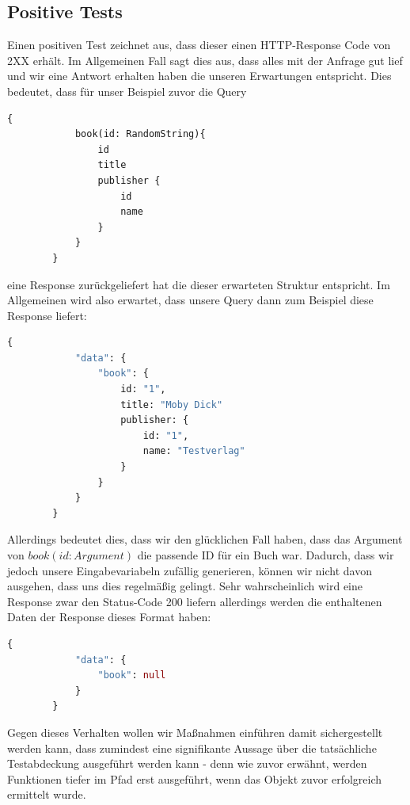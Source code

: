 \subsection{Positive Tests}
Einen positiven Test zeichnet aus, dass dieser einen HTTP-Response Code von 2XX erhält.
Im Allgemeinen Fall sagt dies aus, dass alles mit der Anfrage gut lief und wir eine Antwort erhalten haben die
unseren Erwartungen entspricht.
Dies bedeutet, dass für unser Beispiel zuvor die Query
\begin{lstlisting}[language=GraphQL]
        {
            book(id: RandomString){
                id
                title
                publisher {
                    id
                    name
                }
            }
        }
\end{lstlisting}

eine Response zurückgeliefert hat die dieser erwarteten Struktur entspricht.
Im Allgemeinen wird also erwartet, dass unsere Query dann zum Beispiel diese Response liefert:

\begin{lstlisting}[language=GraphQL]
        {
            "data": {
                "book": {
                    id: "1",
                    title: "Moby Dick"
                    publisher: {
                        id: "1",
                        name: "Testverlag"
                    }
                }
            }
        }
\end{lstlisting}

Allerdings bedeutet dies, dass wir den glücklichen Fall haben, dass das Argument von $book(id: Argument)$ die passende
ID für ein Buch war.
Dadurch, dass wir jedoch unsere Eingabevariabeln zufällig generieren, können wir nicht davon ausgehen, dass uns dies regelmäßig gelingt.
Sehr wahrscheinlich wird eine Response zwar den Status-Code 200 liefern allerdings werden die enthaltenen Daten der Response
dieses Format haben:

\begin{lstlisting}[language=GraphQL, caption={mangelhafte Response}]
        {
            "data": {
                "book": null
            }
        }
\end{lstlisting}


Gegen dieses Verhalten wollen wir Maßnahmen einführen damit sichergestellt werden kann, dass zumindest eine signifikante Aussage über die
tatsächliche Testabdeckung ausgeführt werden kann - denn wie zuvor erwähnt, werden Funktionen tiefer im Pfad erst ausgeführt, wenn das Objekt zuvor
erfolgreich ermittelt wurde.

